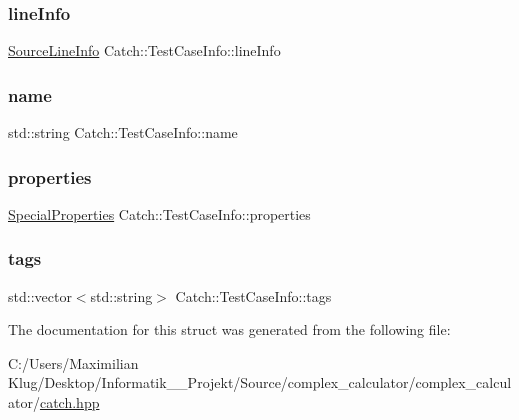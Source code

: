 \subsubsection{\texorpdfstring{line\+Info}{lineInfo}}
{\footnotesize\ttfamily \mbox{\hyperlink{struct_catch_1_1_source_line_info}{Source\+Line\+Info}} Catch\+::\+Test\+Case\+Info\+::line\+Info}

\mbox{\label{struct_catch_1_1_test_case_info_a463794e2f5cfead307c93efd134ade36}} 
\subsubsection{\texorpdfstring{name}{name}}
{\footnotesize\ttfamily std\+::string Catch\+::\+Test\+Case\+Info\+::name}

\mbox{\label{struct_catch_1_1_test_case_info_afc1e84bd7a2e180895a06d9131302af0}} 
\subsubsection{\texorpdfstring{properties}{properties}}
{\footnotesize\ttfamily \mbox{\hyperlink{struct_catch_1_1_test_case_info_a39b232f74b4a7a6f2183b96759027eac}{Special\+Properties}} Catch\+::\+Test\+Case\+Info\+::properties}

\mbox{\label{struct_catch_1_1_test_case_info_a150a7cbca1dd0c91799ccb14ff822eb0}} 
\subsubsection{\texorpdfstring{tags}{tags}}
{\footnotesize\ttfamily std\+::vector$<$std\+::string$>$ Catch\+::\+Test\+Case\+Info\+::tags}



The documentation for this struct was generated from the following file\+:\begin{DoxyCompactItemize}
\item 
C\+:/\+Users/\+Maximilian Klug/\+Desktop/\+Informatik\+\_\+\_\+\+Projekt/\+Source/complex\+\_\+calculator/complex\+\_\+calculator/\mbox{\hyperlink{catch_8hpp}{catch.\+hpp}}\end{DoxyCompactItemize}
